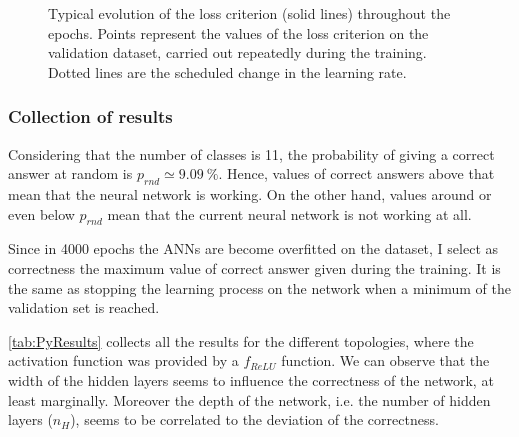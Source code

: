 \begin{figure}[htbp]
	\centering
	
	\caption{Typical evolution of the loss criterion (solid lines) throughout the epochs.
		Points represent the values of the loss criterion on the validation dataset, carried out repeatedly during the training.
		Dotted lines are the scheduled change in the learning rate.
	}
	\label{fig:PyTorch_learning}
\end{figure}


\newpage
\subsubsection{Collection of results}
Considering that the number of classes is \num{11}, the probability of giving a correct answer at random is $p_{rnd}\simeq \SI{9.09}{\percent}$.
Hence, values of correct answers above that mean that the neural network is working.
On the other hand, values around or even below $p_{rnd}$ mean that the current neural network is not working at all.

Since in \num{4000} epochs the \acp{ANN} are become overfitted on the dataset, I select as correctness the maximum value of correct answer given during the training.
It is the same as stopping the learning process on the network when a minimum of the validation set is reached.

\autoref{tab:PyResults} collects all the results for the different topologies, where the activation function was provided by a $f_{ReLU}$ function.
We can observe that the width of the hidden layers seems to influence the correctness of the network, at least marginally.
Moreover the depth of the network, i.e. the number of hidden layers ($n_H$), seems to be correlated to the deviation of the correctness.


